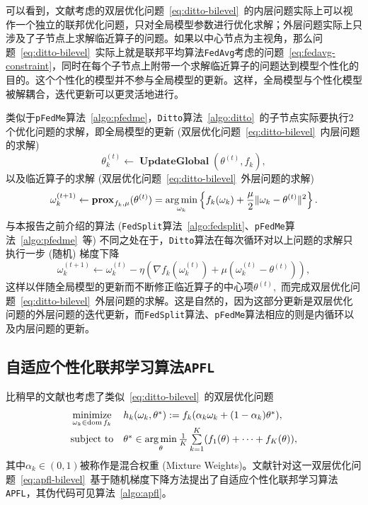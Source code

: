 

可以看到，文献\parencite{li_2021_ditto}考虑的双层优化问题~\eqref{eq:ditto-bilevel}~的内层问题实际上可以视作一个独立的联邦优化问题，只对全局模型参数进行优化求解；外层问题实际上只涉及了子节点上求解临近算子的问题。如果以中心节点为主视角，那么问题~\eqref{eq:ditto-bilevel}~实际上就是联邦平均算法\texttt{FedAvg}考虑的问题~\eqref{eq:fedavg-constraint}，同时在每个子节点上附带一个求解临近算子的问题达到模型个性化的目的。这个个性化的模型并不参与全局模型的更新。这样，全局模型与个性化模型被解耦合，迭代更新可以更灵活地进行。

类似于\texttt{pFedMe}算法~\ref{algo:pfedme}，\texttt{Ditto}算法~\ref{algo:ditto}~的子节点实际要执行2个优化问题的求解，即全局模型的更新 (双层优化问题~\eqref{eq:ditto-bilevel}~内层问题的求解)
\begin{equation}
\label{eq:ditto-global}
\theta_k^{(t)} \gets \operatorname{\mathbf{UpdateGlobal}}(\theta^{(t)}, f_k),
\end{equation}
以及临近算子的求解 (双层优化问题~\eqref{eq:ditto-bilevel}~外层问题的求解)
\begin{equation}
\label{eq:ditto-local-1}
\omega_k^{(t+1)} \gets \mathbf{prox}_{f_k, \mu} (\theta^{(t)}) = \operatorname*{arg\,min}\limits_{\omega_k} \left\{ f_k(\omega_k) + \frac{\mu}{2} \lVert \omega_k - \theta^{(t)} \rVert^2 \right\}.
\end{equation}
与本报告之前介绍的算法 (\texttt{FedSplit}算法~\ref{algo:fedsplit}、\texttt{pFedMe}算法~\ref{algo:pfedme}~等) 不同之处在于，\texttt{Ditto}算法在每次循环对以上问题的求解只执行一步 (随机) 梯度下降
\begin{equation}
\label{eq:ditto-local-2}
\omega_k^{(t+1)} \gets \omega_k^{(t)} - \eta \left( \nabla f_k(\omega_k^{(t)}) + \mu (\omega_k^{(t)} - \theta^{(t)}) \right),
\end{equation}
这样以伴随全局模型的更新而不断修正临近算子的中心项$\theta^{(t)},$ 而完成双层优化问题~\eqref{eq:ditto-bilevel}~外层问题的求解。这是自然的，因为这部分更新是双层优化问题的外层问题的迭代更新，而\texttt{FedSplit}算法、\texttt{pFedMe}算法相应的则是内循环以及内层问题的更新。

\subsection*{自适应个性化联邦学习算法\texttt{APFL}}

比\parencite{li_2021_ditto}稍早的文献\parencite{deng2020_apfl}也考虑了类似~\eqref{eq:ditto-bilevel}~的双层优化问题
\begin{equation}
\label{eq:apfl-bilevel}
\begin{array}{cl}
\operatorname*{minimize}\limits_{\omega_k \in \operatorname{dom} f_k} & h_k(\omega_k, \theta^*) := f_k( \alpha_k \omega_k + (1 - \alpha_k) \theta^* ), \\
\text{subject to} & \theta^* \in \operatorname*{arg\,min}\limits_{\theta} \frac{1}{K} \sum\limits_{k=1}^K (f_1(\theta) + \cdots + f_K(\theta)),
\end{array}
\end{equation}
其中$\alpha_k \in (0, 1)$被称作是混合权重 (Mixture Weights)。文献\parencite{deng2020_apfl}针对这一双层优化问题~\eqref{eq:apfl-bilevel}~基于随机梯度下降方法提出了自适应个性化联邦学习算法\texttt{APFL}，其伪代码可见算法~\ref{algo:apfl}。


